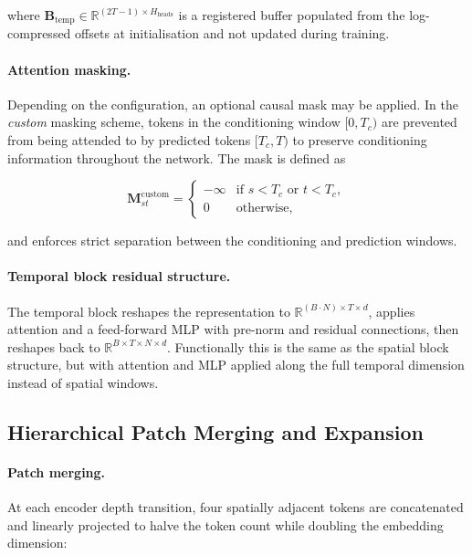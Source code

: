 where $\mathbf{B}_{\text{temp}} \in \mathbb{R}^{(2T-1) \times H_{\text{heads}}}$ is a registered buffer populated from the log-compressed offsets at initialisation and not updated during training.

\paragraph{Attention masking.}
Depending on the configuration, an optional causal mask may be applied. In the \emph{custom} masking scheme, tokens in the conditioning window $[0, T_c)$ are prevented from being attended to by predicted tokens $[T_c, T)$ to preserve conditioning information throughout the network. The mask is defined as

\begin{equation}
    \mathbf{M}^{\text{custom}}_{st} = \begin{cases} -\infty & \text{if } s < T_c \text{ or } t < T_c,\\ 0 & \text{otherwise,} \end{cases}
\end{equation}

and enforces strict separation between the conditioning and prediction windows. 

\paragraph{Temporal block residual structure.}
The temporal block reshapes the representation to $\mathbb{R}^{(B \cdot N) \times T \times d}$, applies attention and a feed-forward MLP with pre-norm and residual connections, then reshapes back to $\mathbb{R}^{B \times T \times N \times d}$. Functionally this is the same as the spatial block structure, but with attention and MLP applied along the full temporal dimension instead of spatial windows.

\subsection{Hierarchical Patch Merging and Expansion}

\paragraph{Patch merging.}
At each encoder depth transition, four spatially adjacent tokens are concatenated and linearly projected to halve the token count while doubling the embedding dimension:

